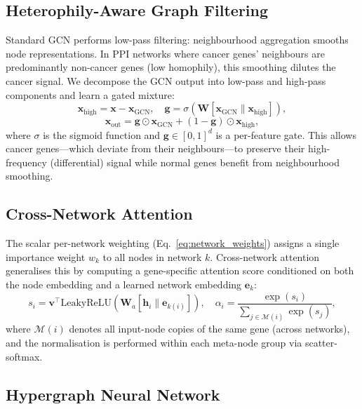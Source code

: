 \subsection{Heterophily-Aware Graph Filtering}

Standard GCN performs low-pass filtering: neighbourhood aggregation smooths node
representations. In PPI networks where cancer genes' neighbours are predominantly
non-cancer genes (low homophily), this smoothing dilutes the cancer signal. We decompose
the GCN output into low-pass and high-pass components and learn a gated mixture:
\begin{equation}
  \mathbf{x}_{\text{high}} = \mathbf{x} - \mathbf{x}_{\text{GCN}}, \quad
  \mathbf{g} = \sigma\!\left(\mathbf{W}[\mathbf{x}_{\text{GCN}} \| \mathbf{x}_{\text{high}}]\right),
  \label{eq:hl_theory}
\end{equation}
\begin{equation}
  \mathbf{x}_{\text{out}} = \mathbf{g} \odot \mathbf{x}_{\text{GCN}} +
  (1 - \mathbf{g}) \odot \mathbf{x}_{\text{high}},
\end{equation}
where $\sigma$ is the sigmoid function and $\mathbf{g} \in [0,1]^d$ is a per-feature gate.
This allows cancer genes---which deviate from their neighbours---to preserve their
high-frequency (differential) signal while normal genes benefit from neighbourhood smoothing.

\subsection{Cross-Network Attention}

The scalar per-network weighting (Eq.~\ref{eq:network_weights}) assigns a single
importance weight $w_k$ to all nodes in network $k$. Cross-network attention generalises
this by computing a gene-specific attention score conditioned on both the node embedding
and a learned network embedding $\mathbf{e}_k$:
\begin{equation}
  s_i = \mathbf{v}^\top \text{LeakyReLU}\!\left(
    \mathbf{W}_a [\mathbf{h}_i \| \mathbf{e}_{k(i)}]\right),
  \quad
  \alpha_i = \frac{\exp(s_i)}{\sum_{j \in \mathcal{M}(i)} \exp(s_j)},
  \label{eq:crossnet_attn}
\end{equation}
where $\mathcal{M}(i)$ denotes all input-node copies of the same gene (across networks),
and the normalisation is performed within each meta-node group via scatter-softmax.

\subsection{Hypergraph Neural Network}

